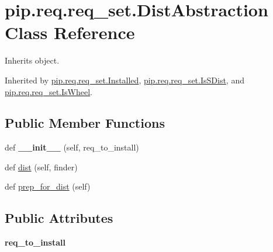 \hypertarget{classpip_1_1req_1_1req__set_1_1_dist_abstraction}{}\section{pip.\+req.\+req\+\_\+set.\+Dist\+Abstraction Class Reference}
\label{classpip_1_1req_1_1req__set_1_1_dist_abstraction}


Inherits object.



Inherited by \hyperlink{classpip_1_1req_1_1req__set_1_1_installed}{pip.\+req.\+req\+\_\+set.\+Installed}, \hyperlink{classpip_1_1req_1_1req__set_1_1_is_s_dist}{pip.\+req.\+req\+\_\+set.\+Is\+S\+Dist}, and \hyperlink{classpip_1_1req_1_1req__set_1_1_is_wheel}{pip.\+req.\+req\+\_\+set.\+Is\+Wheel}.

\subsection*{Public Member Functions}
\begin{DoxyCompactItemize}
\item 
\mbox{\label{classpip_1_1req_1_1req__set_1_1_dist_abstraction_a4778d5a024088f75f8fb4f3eb3d410a7}} 
def {\bfseries \+\_\+\+\_\+init\+\_\+\+\_\+} (self, req\+\_\+to\+\_\+install)
\item 
def \hyperlink{classpip_1_1req_1_1req__set_1_1_dist_abstraction_a7c0a313f6747e489e8498d16dbbd20ec}{dist} (self, finder)
\item 
def \hyperlink{classpip_1_1req_1_1req__set_1_1_dist_abstraction_af4fa3f620557141cb77fbaeb9728a3b5}{prep\+\_\+for\+\_\+dist} (self)
\end{DoxyCompactItemize}
\subsection*{Public Attributes}
\begin{DoxyCompactItemize}
\item 
\mbox{\label{classpip_1_1req_1_1req__set_1_1_dist_abstraction_a9fc1a732b1a8cf067596b1e2ed0840ae}} 
{\bfseries req\+\_\+to\+\_\+install}
\end{DoxyCompactItemize}


